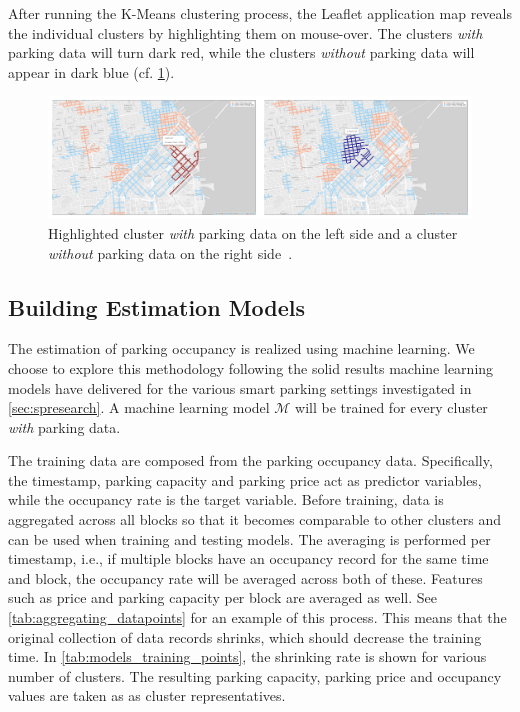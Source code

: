 	After running the K-Means clustering process, the Leaflet application map reveals the individual clusters by highlighting them on mouse-over. The clusters \textit{with} parking data will turn dark red, while the clusters \textit{without} parking data will appear in dark blue (cf. \cref{fig:highlighted_collage}). 
	
	\begin{figure}[!ht]
		\centering
		\includegraphics[width=\textwidth]{graphics/highlighted_collage.png}
		\caption{Highlighted cluster \textit{with} parking data on the left side and a cluster \textit{without} parking data on the right side~\protect\cite{web_application}.}
		\label{fig:highlighted_collage}
	\end{figure}
	
	\subsection{Building Estimation Models}
	The estimation of parking occupancy is realized using machine learning. We choose to explore this methodology following the solid results machine learning models have delivered for the various smart parking settings investigated in \cref{sec:spresearch}. A machine learning model $\mathcal{M}$ will be trained for every cluster \textit{with} parking data.
	
	The training data are composed from the parking occupancy data. Specifically, the timestamp, parking capacity and parking price act as predictor variables, while the occupancy rate is the target variable. Before training, data is aggregated across all blocks so that it becomes comparable to other clusters and can be used when training and testing models. The averaging is performed per timestamp, i.e., if multiple blocks have an occupancy record for the same time and block, the occupancy rate will be averaged across both of these. Features such as price and parking capacity per block are averaged as well. See \cref{tab:aggregating_datapoints} for an example of this process. This means that the original collection of data records shrinks, which should decrease the training time. In \cref{tab:models_training_points}, the shrinking rate is shown for various number of clusters. The resulting parking capacity, parking price and occupancy values are taken as as cluster representatives.
	
